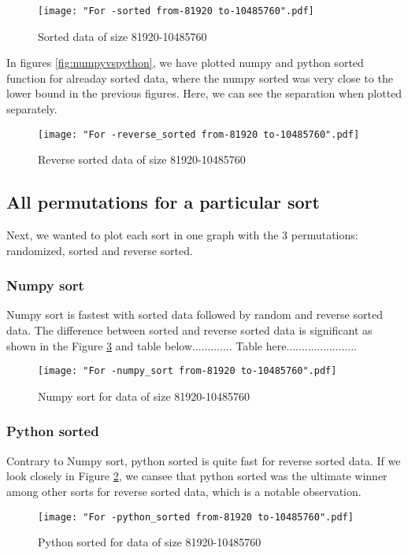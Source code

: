 \documentclass[sigconf,  natbib, screen]{acmart}
\begin{document}
\begin{figure}[ht]
\texttt{[image: "For -sorted from-81920 to-10485760".pdf]}
    \caption{Sorted data of size 81920-10485760 }
    \label{fig:sorted1}
\end{figure}

In figures \ref{fig:numpyvspython}, we have plotted numpy and python sorted function for alreaday sorted data, where the numpy sorted was very close to the lower bound in the previous figures. Here, we can see the separation when plotted separately.


\begin{figure}[ht]
\texttt{[image: "For -reverse\_sorted from-81920 to-10485760".pdf]}
    \caption{Reverse sorted data of size 81920-10485760 }
    \label{fig:rsorted1}
\end{figure}

\subsection{All permutations for a particular sort }\label{allpermut}

Next, we wanted to plot each sort in one graph with the 3 permutations: randomized, sorted and reverse sorted.

\subsubsection{Numpy sort}
Numpy sort is fastest with sorted data followed by random and reverse sorted data. The difference between sorted and reverse sorted data is significant as shown in the Figure \ref{fig:numpysort} and table below............. Table here.......................
\begin{figure}[ht]
\texttt{[image: "For -numpy\_sort from-81920 to-10485760".pdf]}
    \caption{Numpy sort for data of size 81920-10485760 }
    \label{fig:numpysort}
\end{figure}

\subsubsection{Python sorted}
Contrary to Numpy sort, python sorted is quite fast for reverse sorted data. If we look closely in Figure \ref{fig:rsorted1}, we cansee that python sorted was the ultimate winner among other sorts for reverse sorted data, which is a notable observation.
\begin{figure}[ht]
\texttt{[image: "For -python\_sorted from-81920 to-10485760".pdf]}
    \caption{Python sorted for data of size 81920-10485760 }
    \label{fig:pythonsorted}
\end{figure}
\end{document}
